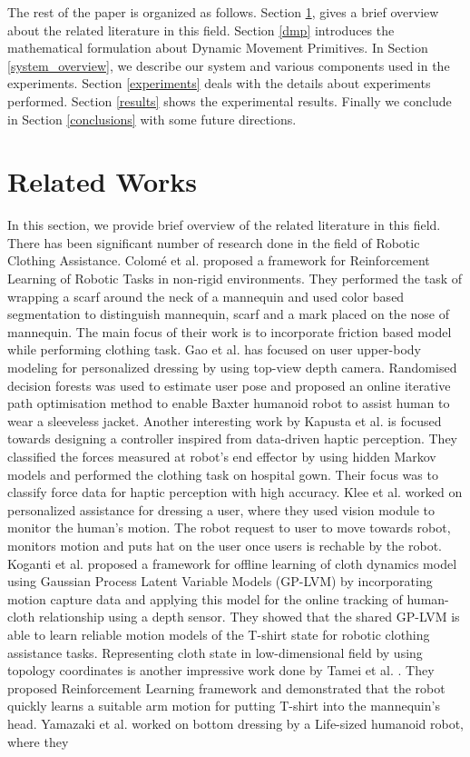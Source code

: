 \documentclass[sigconf]{acmart}
\begin{document}
The rest of the paper is organized as follows. Section \ref{related_works}, gives a brief overview about the related literature in this field. Section \ref{dmp} introduces the mathematical formulation about Dynamic Movement Primitives. In Section \ref{system_overview}, we describe our system and various components used in the experiments. Section \ref{experiments} deals with the details about experiments performed. Section \ref{results} shows the experimental results. Finally we conclude in Section \ref{conclusions} with some future directions.

\section{Related Works}
\label{related_works}
In this section, we provide brief overview of the related literature in this field. There has been significant number of research done in the field of Robotic Clothing Assistance. Colom{\'e} et al. \cite{colome2015friction} proposed a framework for Reinforcement Learning of Robotic Tasks in non-rigid environments. They performed the task of wrapping a scarf around the neck of a mannequin and used color based segmentation to distinguish mannequin, scarf and a mark placed on the nose of mannequin. The main focus of their work is to incorporate friction based model while performing clothing task. Gao et al. \cite{gao2015user, gao2016iterative} has focused on user upper-body modeling for personalized dressing by using top-view depth camera. Randomised decision forests was used to estimate user pose and proposed an online iterative path optimisation method to enable Baxter humanoid robot to assist human to wear a sleeveless jacket. Another interesting work by Kapusta et al. \cite{kapusta2016data} is focused towards designing a controller inspired from data-driven haptic perception. They classified the forces measured at robot's end effector by using hidden Markov models and performed the clothing task on hospital gown. Their focus was to classify force data for haptic perception with high accuracy. Klee et al. \cite{klee2015personalized} worked on personalized assistance for dressing a user, where they used vision module to monitor the human's motion. The robot request to user to move towards robot, monitors motion and puts hat on the user once users is rechable by the robot. Koganti et al. \cite{koganti2015cloth} proposed a framework for offline learning of cloth dynamics model using Gaussian Process Latent Variable Models (GP-LVM) by incorporating motion capture data and applying this model for the online tracking of human-cloth relationship using a depth sensor. They showed that the shared GP-LVM is able to learn reliable motion models of the T-shirt state for robotic clothing assistance tasks. Representing cloth state in low-dimensional field by using topology coordinates is another impressive work done by Tamei et al. \cite{tamei2011reinforcement}. They proposed Reinforcement Learning framework and demonstrated that the robot quickly learns a suitable arm motion for putting T-shirt into the mannequin's head. Yamazaki et al. \cite{yamazaki2013method, yamazaki2014bottom}  worked on bottom dressing by a Life-sized humanoid robot, where they 
\end{document}
